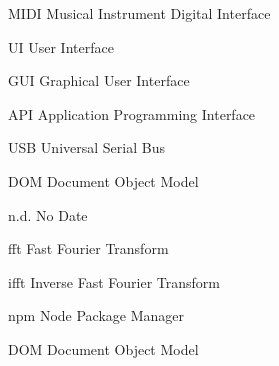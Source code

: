 \begin{acronyms}
  \item[MIDI] Musical Instrument Digital Interface
  \item[UI] User Interface
  \item[GUI] Graphical User Interface
  \item[API] Application Programming Interface
  \item[USB] Universal Serial Bus
  \item[DOM] Document Object Model
  \item[n.d.] No Date
  \item[fft] Fast Fourier Transform
  \item[ifft] Inverse Fast Fourier Transform
  \item[npm] Node Package Manager
  \item[DOM] Document Object Model
\end{acronyms}
